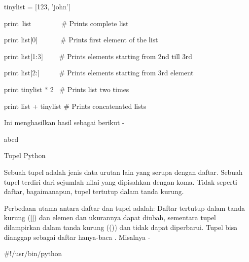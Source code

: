 \noindent 
tinylist = [123, 'john'] \par
\vspace{12pt}
\noindent 
print~list~~~~~~~~   $  \#  $ Prints complete list \par
\noindent 
print list[0]~~~~~~  $  \#  $ Prints first element of the list \par
\noindent 
print list[1:3]~~~~  $  \#  $ Prints elements starting from 2nd till 3rd  \par
\noindent 
print list[2:]~~~~~  $  \#  $ Prints elements starting from 3rd element \par
\noindent 
print tinylist * 2~  $  \#  $ Prints list two times \par
\noindent 
print list + tinylist  $  \#  $ Prints concatenated lists \par
\vspace{12pt}
\noindent 
Ini menghasilkan hasil sebagai berikut - \par
\vspace{12pt}
 \par
\noindent 
abcd \par
\noindent 
[786, 2.23] \par
\noindent 
[2.23, 'john', 70.200000000000003] \par
{} \par
{} \par
\vspace{12pt}
\noindent 
Tupel Python \par
\vspace{12pt}
\noindent 
Sebuah tupel adalah jenis data urutan lain yang serupa dengan daftar. $  $Sebuah tupel terdiri dari sejumlah nilai yang dipisahkan dengan koma. $  $Tidak seperti daftar, bagaimanapun, tupel tertutup dalam tanda kurung. \par
\vspace{12pt}
\noindent 
Perbedaan utama antara daftar dan tupel adalah: Daftar tertutup dalam tanda kurung ([]) dan elemen dan ukurannya dapat diubah, sementara tupel dilampirkan dalam tanda kurung (()) dan tidak dapat diperbarui. $  $Tupel bisa dianggap sebagai $  $daftar $  $hanya-baca $  $. $  $Misalnya - \par
\vspace{12pt}
\noindent 
 $  \#  $!/usr/bin/python \par
\vspace{12pt}
